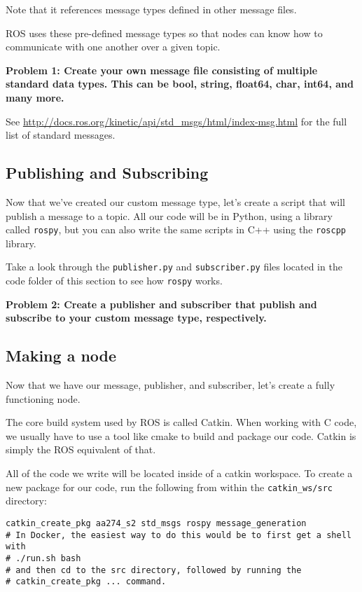 Note that it references message types defined in other message files.

ROS uses these pre-defined message types so that nodes can know how to communicate with one another over a given topic.

\textbf{Problem 1: Create your own message file consisting of multiple standard data types. This can be bool, string, float64, char, int64, and many more.}

See \url{http://docs.ros.org/kinetic/api/std_msgs/html/index-msg.html} for the full list of standard messages.


\subsection{Publishing and Subscribing}
Now that we've created our custom message type, let's create a script that will publish a message to a topic. All our code will be in Python, using a library called \texttt{rospy}, but you can also write the same scripts in C++ using the \texttt{roscpp} library. 

Take a look through the \texttt{publisher.py} and \texttt{subscriber.py} files located in the code folder of this section to see how \texttt{rospy} works.

\textbf{Problem 2: Create a publisher and subscriber that publish and subscribe to your custom message type, respectively.}


\subsection{Making a node}
Now that we have our message, publisher, and subscriber, let's create a fully functioning node.

The core build system used by ROS is called Catkin. When working with C code, we usually have to use a tool like cmake to build and package our code. Catkin is simply the ROS equivalent of that. 

All of the code we write will be located inside of a catkin workspace. To create a new package for our code, run the following from within the \texttt{catkin\_ws/src} directory:

\begin{lstlisting}
catkin_create_pkg aa274_s2 std_msgs rospy message_generation
# In Docker, the easiest way to do this would be to first get a shell with 
# ./run.sh bash 
# and then cd to the src directory, followed by running the 
# catkin_create_pkg ... command.
\end{lstlisting}

